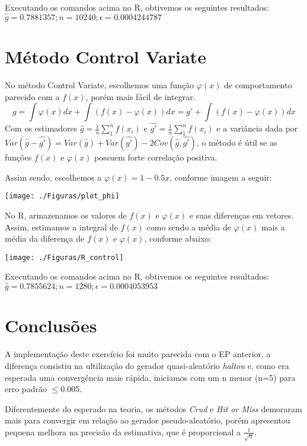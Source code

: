 \documentclass{article}
\begin{document}
Executando os comandos acima no R, obtivemos os seguintes resultados:\\
$\hat{g} = 0.7881357; n = 10240;    \epsilon = 0.0004244787$

\section{Método Control Variate}


No método Control Variate, escolhemos uma função $\varphi(x)$ de comportamento parecido com a $f(x)$, porém mais fácil de integrar.
$$
g = \int \varphi(x)dx + \int( f(x) - \varphi(x))dx  = g' + \int( f(x) - \varphi(x))dx
$$
Com os estimadores $\hat{g} = \frac{1}{n}\sum_{1}^{n}f(x_i)$ e $\hat{g'} = \frac{1}{n}\sum_{1}^{n}f(x_i)$ e a variância dada por $Var(\hat{g} - \hat{g'}) = Var(\hat{g})+Var(\hat{g'})-2Cov(\hat{g}, \hat{g'})$, o método é útil se as funções $f(x)$ e $\varphi(x)$ possuem forte correlação positiva.


Assim sendo, escolhemos a $\varphi(x) = 1 - 0.5x$, conforme imagem a seguir:
\begin{center}
  \texttt{[image: ./Figuras/plot\_phi]}\\
\end{center}  


No R, armazenamos os valores de $f(x)$ e $\varphi(x)$ e suas diferenças em vetores. Assim, estimamos a integral de $f(x)$ como sendo a média de $\varphi(x)$  mais a média da diferença de $f(x)$ e $\varphi(x)$, conforme abaixo:
\begin{center}
  \texttt{[image: ./Figuras/R\_control]}\\
\end{center} 
Executando os comandos acima no R, obtivemos os seguintes resultados:\\
$\hat{g} = 0.7855624; n = 1280;    \epsilon = 0.0004053953$

\section{Conclusões}

A implementação deste exercício foi muito parecida com o EP anterior, a diferença consistiu na ultilização do gerador quasi-aleatório \textit{halton} e, como era esperada uma convergência mais rápida, iniciamos com um n menor (n=5) para erro padrão $\leq$0.005.


Diferentemente do esperado na teoria, os métodos \textit{Crud} e \textit{Hit or Miss} demoraram mais para convergir em relação ao gerador pseudo-aleatório, porém apresentou pequena melhora na precisão da estimativa, que é proporcional a $\frac{1}{\sqrt{n}}$.
\end{document}
